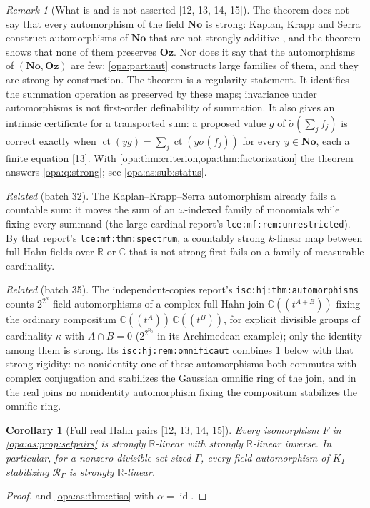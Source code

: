 \documentclass[11pt,oneside]{article}
\numberwithin{equation}{section}
\newtheorem{corollary}[corollary]{Corollary}
\theoremstyle{definition}
\theoremstyle{remark}
\newtheorem{remark}[remark]{Remark}
\newcommand{\No}{\mathbf{No}}
\newcommand{\Oz}{\mathbf{Oz}}
\newcommand{\R}{\mathbb R}
\newcommand{\C}{\mathbb C}
\newcommand{\ct}{\operatorname{ct}}
\newcommand{\id}{\operatorname{id}}
\newcommand{\src}[1]{\textup{\textsf{\small[#1]}}}
\newcommand{\lbl}[1]{\nolinkurl{#1}}
\begin{document}
\begin{remark}[What is and is not asserted \src{12, 13, 14, 15}]\label{opa:as:rem:main}
The theorem does not say that every automorphism of the field $\No$ is strong:
Kaplan, Krapp and Serra construct automorphisms of $\No$ that are not strongly additive
\cite[Example 4.4]{KKS}, and the theorem shows that none of them preserves $\Oz$. Nor does it
say that the automorphisms of $(\No,\Oz)$ are few: \cref{opa:part:aut} constructs large
families of them, and they are strong by construction. The theorem is a regularity
statement. It identifies the summation operation as preserved by these maps; invariance
under automorphisms is not first-order definability of summation. It also gives an
intrinsic certificate for a transported sum: a proposed value $g$ of
$\widetilde\sigma(\sum_jf_j)$ is correct exactly when
$\ct(yg)=\sum_j\ct(y\widetilde\sigma(f_j))$ for every $y\in\No$, each a finite equation
\src{13}. With \cref{opa:thm:criterion,opa:thm:factorization} the theorem answers
\cref{opa:q:strong}; see \cref{opa:as:sub:status}.
\end{remark}

\emph{Related} (batch 32). The Kaplan--Krapp--Serra automorphism already fails a countable sum: it moves the sum of an
$\omega$-indexed family of monomials while fixing every summand (the large-cardinal report's
\lbl{lce:mf:rem:unrestricted}). By that report's \lbl{lce:mf:thm:spectrum}, a countably strong $k$-linear map between
full Hahn fields over $\R$ or $\C$ that is not strong first fails on a family of measurable cardinality.

\emph{Related} (batch 35). The independent-copies report's \lbl{isc:hj:thm:automorphisms} counts
$2^{2^\kappa}$ field automorphisms of a complex full Hahn join $\C((t^{A+B}))$ fixing the ordinary compositum
$\C((t^A))\,\C((t^B))$, for explicit divisible groups of cardinality $\kappa$ with $A\cap B=0$ ($2^{2^{\aleph_0}}$ in its
Archimedean example); only the identity among them is strong. Its \lbl{isc:hj:rem:omnificaut} combines
\cref{opa:as:cor:setpairs} below with that strong rigidity: no nonidentity one of these automorphisms both commutes
with complex conjugation and stabilizes the Gaussian omnific ring of the join, and in the real joins no nonidentity
automorphism fixing the compositum stabilizes the omnific ring.

\begin{corollary}[Full real Hahn pairs \src{12, 13, 14, 15}]\label{opa:as:cor:setpairs}
Every isomorphism $F$ in \cref{opa:as:prop:setpairs} is strongly $\R$-linear with strongly
$\R$-linear inverse. In particular, for a nonzero divisible set-sized $\Gamma$, every field
automorphism of $K_\Gamma$ stabilizing $\mathcal R_\Gamma$ is strongly $\R$-linear.
\end{corollary}
\begin{proof}
 and \cref{opa:as:thm:ctiso} with $\alpha=\id$.
\end{proof}
\end{document}
